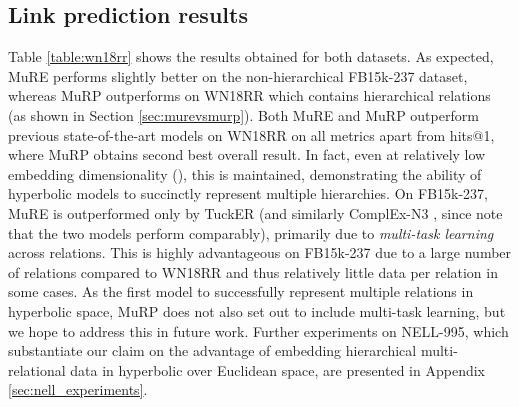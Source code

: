 \documentclass{article}
\begin{document}
\subsection{Link prediction results}

Table \ref{table:wn18rr} shows the results obtained for both datasets. As expected, MuRE performs slightly better on the non-hierarchical FB15k-237 dataset, whereas MuRP outperforms on WN18RR which contains hierarchical relations (as shown in Section \ref{sec:murevsmurp}). Both MuRE and MuRP outperform previous state-of-the-art models on WN18RR on all metrics apart from hits@1, where MuRP obtains second best overall result. In fact, even at relatively low embedding dimensionality (), this is maintained, demonstrating the ability of hyperbolic models to succinctly represent multiple hierarchies. On FB15k-237, MuRE is outperformed only by TuckER \citep{balazevic2019tucker} (and similarly ComplEx-N3 \citep{lacroix2018canonical}, since \citet{balazevic2019tucker} note that the two models perform comparably), primarily due to \textit{multi-task learning} across relations. This is highly advantageous on FB15k-237 due to a large number of relations compared to WN18RR and thus relatively little data per relation in some cases. As the first model to successfully represent multiple relations in hyperbolic space, MuRP does not also set out to include multi-task learning, but we hope to address this in future work. Further experiments on NELL-995, which substantiate our claim on the advantage of embedding hierarchical multi-relational data in hyperbolic over Euclidean space, are presented in Appendix \ref{sec:nell_experiments}.
\end{document}
